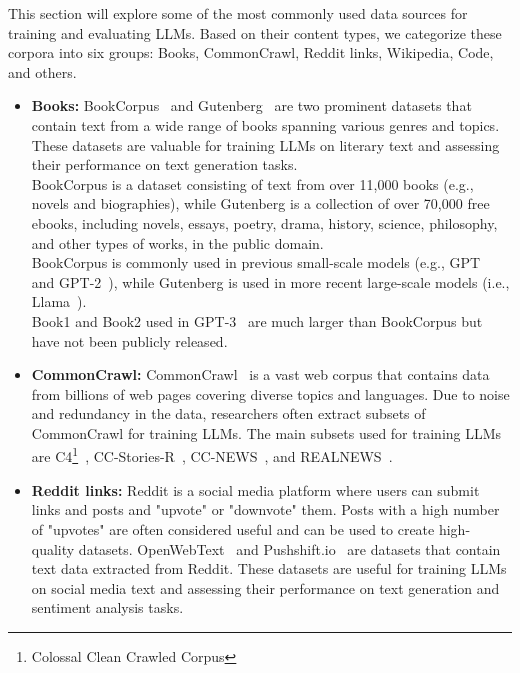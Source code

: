 This section will explore some of the most commonly used data sources for training and evaluating LLMs.
Based on their content types, we categorize these corpora into six groups: Books, CommonCrawl, Reddit links, Wikipedia, Code, and others.

\begin{itemize}
	\item \textbf{Books:} {
		      BookCorpus~\cite{zhu2015aligning} and Gutenberg~\cite{projectgutenberg} are two prominent datasets that contain text from a wide range of books spanning various genres and topics. These datasets are valuable for training LLMs on literary text and assessing their performance on text generation tasks.\\
		      BookCorpus is a dataset consisting of text from over 11,000 books (e.g., novels and biographies), while Gutenberg is a collection of over 70,000 free ebooks, including novels, essays, poetry, drama, history, science, philosophy, and other types of works, in the public domain.\\
		      BookCorpus is commonly used in previous small-scale models (e.g., GPT~\cite{radford2018improving} and GPT-2~\cite{radford2019language}), while Gutenberg is used in more recent large-scale models (i.e., Llama~\cite{touvron2023llama}).\\
		      Book1 and Book2 used in GPT-3~\cite{brown2020language} are much larger than BookCorpus but have not been publicly released.
	      }
	\item \textbf{CommonCrawl:} {
		      CommonCrawl~\cite{commoncrawl} is a vast web corpus that contains data from billions of web pages covering diverse topics and languages. Due to noise and redundancy in the data, researchers often extract subsets of CommonCrawl for training LLMs. The main subsets used for training LLMs are C4\footnote{Colossal Clean Crawled Corpus}~\cite{raffel2023exploring}, CC-Stories-R~\cite{trinh2018simple}, CC-NEWS~\cite{liu2019roberta}, and REALNEWS~\cite{zellers2019defending}.\\
	      }
	\item \textbf{Reddit links:} {
		      Reddit is a social media platform where users can submit links and posts and "upvote" or "downvote" them. Posts with a high number of "upvotes" are often considered useful and can be used to create high-quality datasets.
		      OpenWebText~\cite{gokaslan2019openwebtext} and Pushshift.io~\cite{baumgartner2020pushshift} are datasets that contain text data extracted from Reddit. These datasets are useful for training LLMs on social media text and assessing their performance on text generation and sentiment analysis tasks.
}
\end{itemize}
